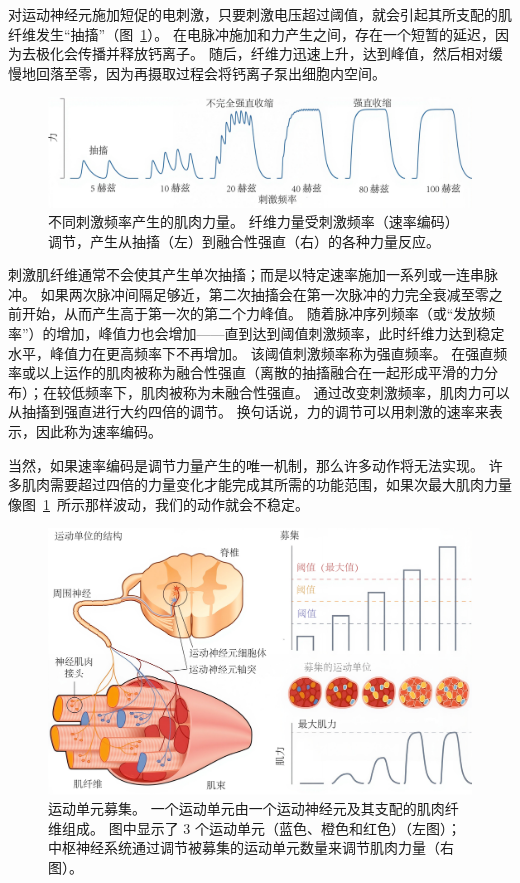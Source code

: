 对运动神经元施加短促的电刺激，只要刺激电压超过阈值，就会引起其所支配的肌纤维发生“抽搐”（图~\ref{fig:4_12}）。
在电脉冲施加和力产生之间，存在一个短暂的延迟，因为去极化会传播并释放钙离子。
随后，纤维力迅速上升，达到峰值，然后相对缓慢地回落至零，因为再摄取过程会将钙离子泵出细胞内空间。


\begin{figure}[!htb]
	\centering
	\includegraphics[width=1.0\linewidth]{chap4/4_12}
	\caption{不同刺激频率产生的肌肉力量。
		纤维力量受刺激频率（速率编码）调节，产生从抽搐（左）到融合性强直（右）的各种力量反应。 \label{fig:4_12}}
\end{figure}


刺激肌纤维通常不会使其产生单次抽搐；而是以特定速率施加一系列或一连串脉冲。
如果两次脉冲间隔足够近，第二次抽搐会在第一次脉冲的力完全衰减至零之前开始，从而产生高于第一次的第二个力峰值。
随着脉冲序列频率（或“发放频率”）的增加，峰值力也会增加——直到达到阈值刺激频率，此时纤维力达到稳定水平，峰值力在更高频率下不再增加。
该阈值刺激频率称为强直频率。
在强直频率或以上运作的肌肉被称为融合性强直（离散的抽搐融合在一起形成平滑的力分布）；在较低频率下，肌肉被称为未融合性强直。
通过改变刺激频率，肌肉力可以从抽搐到强直进行大约四倍的调节。
换句话说，力的调节可以用刺激的速率来表示，因此称为速率编码。


当然，如果速率编码是调节力量产生的唯一机制，那么许多动作将无法实现。
许多肌肉需要超过四倍的力量变化才能完成其所需的功能范围，如果次最大肌肉力量像图~\ref{fig:4_12}~所示那样波动，我们的动作就会不稳定。


\begin{figure}[!htb]
	\centering
	\includegraphics[width=1.0\linewidth]{chap4/4_13}
	\caption{运动单元募集。
		一个运动单元由一个运动神经元及其支配的肌肉纤维组成。
		图中显示了 3 个运动单元（蓝色、橙色和红色）（左图）；
		中枢神经系统通过调节被募集的运动单元数量来调节肌肉力量（右图）。 \label{fig:4_13}}
\end{figure}



